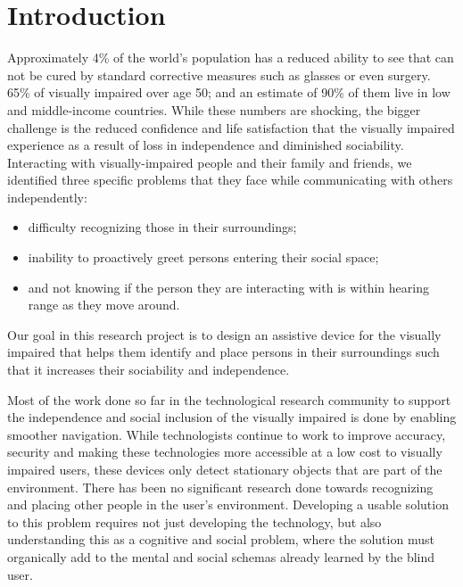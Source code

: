 \section{Introduction}
% 
% 
Approximately 4\% of the world's population has a reduced ability to see that can not be cured by standard corrective measures such as glasses or even surgery. 65\% of visually impaired over age 50; and an estimate of 90\% of them live in low and middle-income countries. While these numbers are shocking, the bigger challenge is the reduced confidence and life satisfaction that the visually impaired experience as a result of loss in independence and diminished sociability. Interacting with visually-impaired people and their family and friends, we identified three specific problems that they face while communicating with others independently: 
\begin{itemize}
\item difficulty recognizing those in their surroundings;
\item inability to proactively greet persons entering their social space;
\item and not knowing if the person they are interacting with is within hearing range as they move around.
\end{itemize}
Our goal in this research project is to design an assistive device for the visually impaired that helps them identify and place persons in their surroundings such that it increases their sociability and independence.

Most of the work done so far in the technological research community to support the independence and social inclusion of the visually impaired is done by enabling smoother navigation. While technologists continue to work to improve accuracy, security and making these technologies more accessible at a low cost to visually impaired users, these devices only detect stationary objects that are part of the environment. There has been no significant research done towards recognizing and placing other people in the user's environment. Developing a usable solution to this problem requires not just developing the technology, but also understanding this as a cognitive and social problem, where the solution must organically add to the mental and social schemas already learned by the blind user. 

